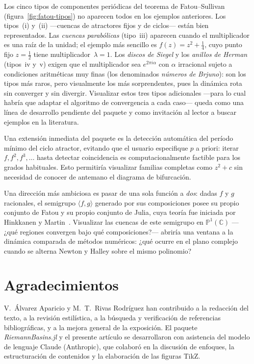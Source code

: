 \documentclass[11pt,a4paper]{article}
\theoremstyle{plain}
\theoremstyle{definition}
\theoremstyle{remark}
\newcommand{\Puno}{\mathbb{P}^1(\mathbb{C})}
\newcommand{\pkg}[1]{\textsl{#1}}
\begin{document}
Los cinco tipos de componentes periódicas del teorema de
Fatou--Sullivan (figura~\ref{fig:fatou-tipos}) no aparecen todos en
los ejemplos anteriores.
Los tipos~(i) y~(ii) —cuencas de atractores fijos y de ciclos— están
bien representados.
Las \emph{cuencas parabólicas} (tipo~iii) aparecen cuando el
multiplicador es una raíz de la unidad; el ejemplo más sencillo es
$f(z)=z^2+\tfrac{1}{4}$, cuyo punto fijo $z=\tfrac{1}{2}$ tiene
multiplicador~$\lambda=1$.
Los \emph{discos de Siegel} y los \emph{anillos de Herman}
(tipos~iv y~v) exigen que el multiplicador sea $e^{2\pi i\alpha}$ con
$\alpha$ irracional sujeto a condiciones aritméticas muy finas
(los denominados \emph{números de Brjuno}): son los tipos más raros,
pero visualmente los más sorprendentes, pues la dinámica rota sin
converger y sin divergir.
Visualizar estos tres tipos adicionales —para lo cual habría que
adaptar el algoritmo de convergencia a cada caso— queda como una
línea de desarrollo pendiente del paquete y como invitación al lector
a buscar ejemplos en la literatura.

Una extensión inmediata del paquete es la detección automática del
período mínimo del ciclo atractor, evitando que el usuario especifique
$p$ a priori: iterar $f, f^2, f^3,\ldots$ hasta detectar coincidencia
es computacionalmente factible para los grados habituales.
Esto permitiría visualizar familias completas como $z^2+c$ sin
necesidad de conocer de antemano el diagrama de bifurcación.

Una dirección más ambiciosa es pasar de una sola función a
\emph{dos}: dadas $f$ y $g$ racionales, el semigrupo
$\langle f,g\rangle$ generado por sus composiciones posee su propio
conjunto de Fatou y su propio conjunto de Julia, cuya teoría fue
iniciada por Hinkkanen y Martin~\cite{HinkkanenMartin1996}.
Visualizar las cuencas de este semigrupo en $\Puno$ —¿qué regiones
convergen bajo qué composiciones?— abriría una ventana a la dinámica
comparada de métodos numéricos: ¿qué ocurre en el plano complejo
cuando se alterna Newton y Halley sobre el mismo polinomio?

\section*{Agradecimientos}

V.~Álvarez Aparicio y M.~T.~Rivas Rodríguez han contribuido a la
redacción del texto, a la revisión estilística, a la búsqueda y
verificación de referencias bibliográficas, y a la mejora general
de la exposición.
El paquete \pkg{RiemannBasins.jl} y el presente artículo se
desarrollaron con asistencia del modelo de lenguaje Claude
(Anthropic), que colaboró en la discusión de enfoques,
la estructuración de contenidos y la elaboración de las figuras
TikZ.
\end{document}
